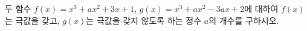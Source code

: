 두 함수 $f(x)=x^3+ax^2+3x+1$, $g(x)=x^3+ax^2-3ax+2$에 대하여 $f(x)$는 극값을 갖고, $g(x)$는 극값을 갖지 않도록 하는 정수 $a$의 개수를 구하시오.

